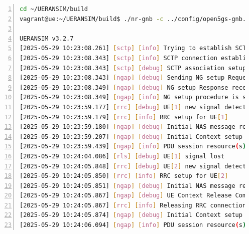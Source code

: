 \begin{lstlisting}[basicstyle=\small, frame=single, breaklines=true, postbreak=\mbox{\textcolor{red}{$\hookrightarrow$}\space}, escapeinside ={\%,}, escapechar={!}, numbers=left, language=sh, caption=gNB run en resultaat]
cd ~/UERANSIM/build
vagrant@ue:~/UERANSIM/build$ ./nr-gnb -c ../config/open5gs-gnb.yaml

UERANSIM v3.2.7
[2025-05-29 10:23:08.261] [sctp] [info] Trying to establish SCTP connection... (10.0.0.10:38412)
[2025-05-29 10:23:08.343] [sctp] [info] SCTP connection established (10.0.0.10:38412)
[2025-05-29 10:23:08.343] [sctp] [debug] SCTP association setup ascId[3]
[2025-05-29 10:23:08.343] [ngap] [debug] Sending NG setup Request
[2025-05-29 10:23:08.349] [ngap] [debug] NG setup Response received
[2025-05-29 10:23:08.349] [ngap] [info] NG setup procedure is successful
[2025-05-29 10:23:59.177] [rrc] [debug] UE[1] new signal detected
[2025-05-29 10:23:59.179] [rrc] [info] RRC setup for UE[1]
[2025-05-29 10:23:59.180] [ngap] [debug] Initial NAS message received from UE[1]
[2025-05-29 10:23:59.207] [ngap] [debug] Initial Context setup Request received
[2025-05-29 10:23:59.439] [ngap] [info] PDU session resource(s) setup for UE[1] count[1]
[2025-05-29 10:24:04.086] [rls] [debug] UE[1] signal lost
[2025-05-29 10:24:05.848] [rrc] [debug] UE[2] new signal detected
[2025-05-29 10:24:05.850] [rrc] [info] RRC setup for UE[2]
[2025-05-29 10:24:05.851] [ngap] [debug] Initial NAS message received from UE[2]
[2025-05-29 10:24:05.867] [ngap] [debug] UE Context Release Command received
[2025-05-29 10:24:05.867] [rrc] [info] Releasing RRC connection for UE[1]
[2025-05-29 10:24:05.874] [ngap] [debug] Initial Context setup Request received
[2025-05-29 10:24:06.094] [ngap] [info] PDU session resource(s) setup for UE[2] count[1]
\end{lstlisting}

